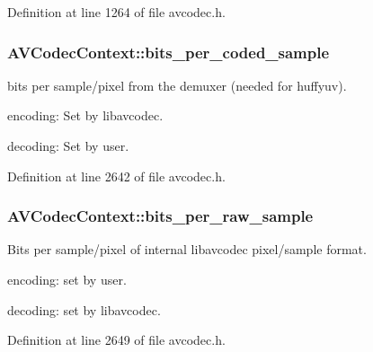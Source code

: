 Definition at line 1264 of file avcodec.\+h.

\subsubsection[{\texorpdfstring{bits\+\_\+per\+\_\+coded\+\_\+sample}{bits_per_coded_sample}}]{ A\+V\+Codec\+Context\+::bits\+\_\+per\+\_\+coded\+\_\+sample}\hypertarget{struct_a_v_codec_context_a5273a8cf73ef598d632c6eee1379d5ad}{}\label{struct_a_v_codec_context_a5273a8cf73ef598d632c6eee1379d5ad}
bits per sample/pixel from the demuxer (needed for huffyuv).
\begin{DoxyItemize}
\item encoding\+: Set by libavcodec.
\item decoding\+: Set by user. 
\end{DoxyItemize}

Definition at line 2642 of file avcodec.\+h.

\subsubsection[{\texorpdfstring{bits\+\_\+per\+\_\+raw\+\_\+sample}{bits_per_raw_sample}}]{ A\+V\+Codec\+Context\+::bits\+\_\+per\+\_\+raw\+\_\+sample}\hypertarget{struct_a_v_codec_context_a889b84d5b3657df4a4e45b17b87848f5}{}\label{struct_a_v_codec_context_a889b84d5b3657df4a4e45b17b87848f5}
Bits per sample/pixel of internal libavcodec pixel/sample format.
\begin{DoxyItemize}
\item encoding\+: set by user.
\item decoding\+: set by libavcodec. 
\end{DoxyItemize}

Definition at line 2649 of file avcodec.\+h.

